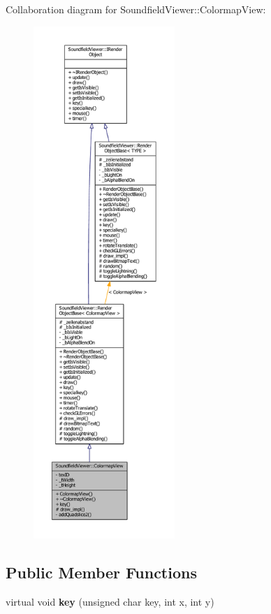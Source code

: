 Collaboration diagram for Soundfield\-Viewer\-:\-:Colormap\-View\-:\nopagebreak
\begin{figure}[H]
\begin{center}
\leavevmode
\includegraphics[height=550pt]{d8/d4b/classSoundfieldViewer_1_1ColormapView__coll__graph}
\end{center}
\end{figure}
\subsection*{Public Member Functions}
\begin{DoxyCompactItemize}
\item 
virtual void {\bfseries key} (unsigned char key, int x, int y)\label{classSoundfieldViewer_1_1ColormapView_afa62d807b0bd80ae975da239998dc7a7}

\end{DoxyCompactItemize}

